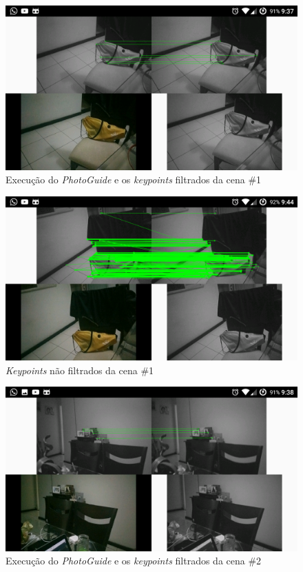 \begin{figure}[H]
	\centering
		\includegraphics[width= \textwidth]{Imagens/figura3-8.png}
	\caption{Execução do \textit{PhotoGuide} e os \textit{keypoints} filtrados da cena \#1}
	\label{fig3:8}
\end{figure}

\begin{figure}[H]
	\centering
		\includegraphics[width= \textwidth]{Imagens/figura3-10.png}
	\caption{\textit{Keypoints} não filtrados da cena \#1}
	\label{fig3:9}
\end{figure}

\begin{figure}[H]
	\centering
		\includegraphics[width= \textwidth]{Imagens/figura3-9.png}
	\caption{Execução do \textit{PhotoGuide} e os \textit{keypoints} filtrados da cena \#2}
	\label{fig3:10}
\end{figure}

